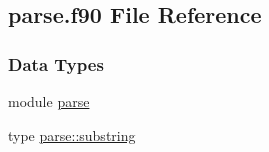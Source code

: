 \hypertarget{parse_8f90}{\subsection{parse.\-f90 File Reference}
\label{parse_8f90}
}
\subsubsection*{Data Types}
\begin{DoxyCompactItemize}
\item 
module \hyperlink{classparse}{parse}
\item 
type \hyperlink{structparse_1_1substring}{parse\-::substring}
\end{DoxyCompactItemize}
